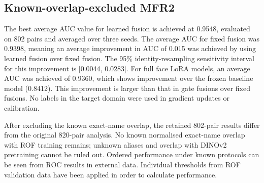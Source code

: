 \documentclass[10pt,lettersize,journal]{IEEEtran}
\begin{document}
\subsection{Known-overlap-excluded MFR2}
The best average AUC value for learned fusion is achieved at 0.9548, evaluated on 802 pairs and averaged over three seeds. The average AUC for fixed fusion was 0.9398, meaning an average improvement in AUC of 0.015 was achieved by using learned fusion over fixed fusion. The 95\% identity-resampling sensitivity interval for this improvement is [0.0044, 0.0283]. For full face LoRA models, an average AUC was achieved of 0.9360, which shows improvement over the frozen baseline model (0.8412). This improvement is larger than that in gate fusions over fixed fusions. No labels in the target domain were used in gradient updates or calibration.\par
After excluding the known exact-name overlap, the retained 802-pair results differ from the original 820-pair analysis. No known normalised exact-name overlap with ROF training remains; unknown aliases and overlap with DINOv2 pretraining cannot be ruled out. Ordered performance under known protocols can be seen from ROC results in external data. Individual thresholds from ROF validation data have been applied in order to calculate performance.\par
\end{document}
